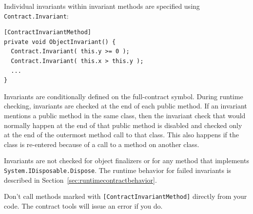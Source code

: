 \documentclass{article}
\newcommand{\code}[1]{\lstinline{#1}}
\begin{document}
Individual invariants within  invariant methods are specified using
\code{Contract.Invariant}:
\begin{lstlisting}
[ContractInvariantMethod]
private void ObjectInvariant() {
  Contract.Invariant( this.y >= 0 );
  Contract.Invariant( this.x > this.y );
  ...
}
\end{lstlisting}
Invariants are conditionally defined on the full-contract
symbol. During runtime checking, invariants
are checked at the end of each public method. If an invariant mentions
a public method in the same class, then the invariant check that would
normally happen at the end of that public method is disabled and
checked only at the end of the outermost method call to that
class. This also happens if the class is re-entered because of a call
to a method on another class.

Invariants are not checked for object finalizers or for any method
that implements \code{System.IDisposable.Dispose}.
The runtime behavior for failed invariants is described in
Section~\ref{sec:runtimecontractbehavior}. 

Don't call methods marked with \code{[ContractInvariantMethod]}
directly from your code. The contract tools will issue an error if you
do. 
\end{document}
